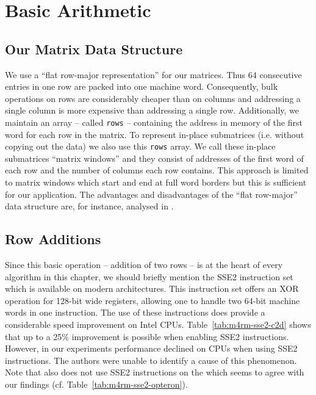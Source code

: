 \section{Basic Arithmetic}
\label{sec:basic}
\subsection{Our Matrix Data Structure}
\label{sec:window}
We use a ``flat row-major representation'' for our matrices. Thus 64 consecutive entries in one row are packed into one machine word. Consequently, bulk operations on rows are considerably cheaper than on columns and addressing a single column is more expensive than addressing a single row. Additionally, we maintain an array -- called \texttt{rows} -- containing the address in memory of the first word for each row in the matrix. To represent in-place submatrices (i.e. without copying out the data) we also use this \texttt{rows} array. We call these in-place submatrices ``matrix windows'' and they consist of addresses of the first word of each row and the number of columns each row contains. This approach is limited to matrix windows which start and end at full word borders but this is sufficient for our application. The advantages and disadvantages of the ``flat row-major'' data structure are, for instance, analysed in \cite{fflas}.

\subsection{Row Additions}
Since this basic operation -- addition of two rows -- is at the heart of every algorithm in this chapter, we should briefly mention the SSE2 instruction set \cite{optcpp} which is available on modern \xBG architectures. This instruction set offers an XOR operation for 128-bit wide registers, allowing one to handle two 64-bit machine words in one instruction. The use of these instructions does provide a considerable speed improvement on Intel CPUs. Table~\ref{tab:m4rm-sse2-c2d} shows that up to a 25\% improvement is possible when enabling SSE2 instructions. However, in our experiments performance declined on \Opteron CPUs when using SSE2 instructions. The authors were unable to identify a cause of this phenomenon.  Note that \Magma also does not use SSE2 instructions on the \Opteron \cite{magma-matmulgf2} which seems to agree with our findings (cf. Table~\ref{tab:m4rm-sse2-opteron}).

